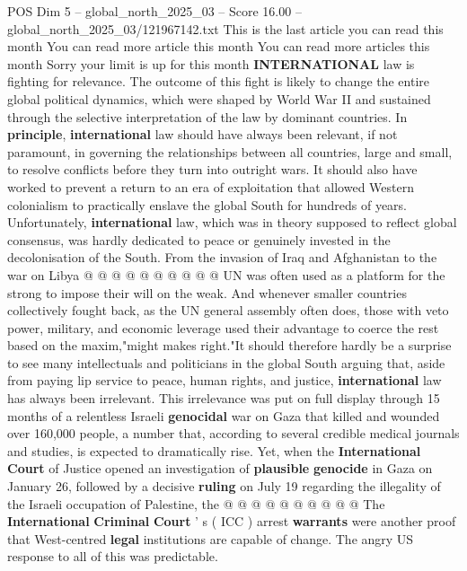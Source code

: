 \begin{textsample}{POS Dim 5 – global\_north\_2025\_03 – Score 16.00 – global\_north\_2025\_03/121967142.txt}  \label{ex:f5_pos_156}
This is the last article you can read this month You can read more article this month You can read more articles this month Sorry your limit is up for this month \textbf{INTERNATIONAL} law is fighting for relevance.
The outcome of this fight is likely to change the entire global political dynamics, which were shaped by World War II and sustained through the selective interpretation of the law by dominant countries.
In \textbf{principle}, \textbf{international} law should have always been relevant, if not paramount, in governing the relationships between all countries, large and small, to resolve conflicts before they turn into outright wars.
It should also have worked to prevent a return to an era of exploitation that allowed Western colonialism to practically enslave the global South for hundreds of years.
Unfortunately, \textbf{international} law, which was in theory supposed to reflect global consensus, was hardly dedicated to peace or genuinely invested in the decolonisation of the South.
From the invasion of Iraq and Afghanistan to the war on Libya @ @ @ @ @ @ @ @ @ @ UN was often used as a platform for the strong to impose their will on the weak.
And whenever smaller countries collectively fought back, as the UN general assembly often does, those with veto power, military, and economic leverage used their advantage to coerce the rest based on the maxim,"might makes right."It should therefore hardly be a surprise to see many intellectuals and politicians in the global South arguing that, aside from paying lip service to peace, human rights, and justice, \textbf{international} law has always been irrelevant.
This irrelevance was put on full display through 15 months of a relentless Israeli \textbf{genocidal} war on Gaza that killed and wounded over 160,000 people, a number that, according to several credible medical journals and studies, is expected to dramatically rise.
Yet, when the \textbf{International} \textbf{Court} of Justice opened an investigation of \textbf{plausible} \textbf{genocide} in Gaza on January 26, followed by a decisive \textbf{ruling} on July 19 regarding the illegality of the Israeli occupation of Palestine, the @ @ @ @ @ @ @ @ @ @ The \textbf{International} \textbf{Criminal} \textbf{Court} ' s ( ICC ) arrest \textbf{warrants} were another proof that West-centred \textbf{legal} institutions are capable of change.
The angry US response to all of this was predictable.

\end{textsample}
